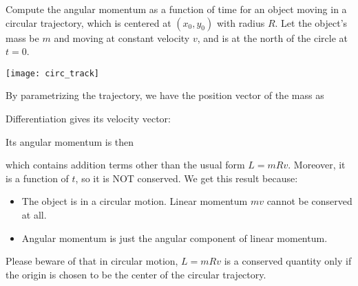 \documentclass[class=article, crop=false, 12pt]{standalone}
\begin{document}
\begin{example}
    Compute the angular momentum as a function of time for an object moving in a circular trajectory,
    which is centered at $(x_0,y_0)$ with radius $R$.
    Let the object's mass be $m$ and moving at constant velocity $v$, 
    and is at the north of the circle at $t=0$.
    
    \begin{center}
        \begin{minipage}{0.4\linewidth}
            \centering
            \texttt{[image: circ\_track]}
        \end{minipage}
    \end{center}

    By parametrizing the trajectory, we have the position vector of the mass as
    
    Differentiation gives its velocity vector:

    Its angular momentum is then

    which contains addition terms other than the usual form $L=mRv$. 
    Moreover, it is a function of $t$, so it is NOT conserved.
    We get this result because:
    \begin{itemize}
        \item The object is in a circular motion. 
        Linear momentum $mv$ cannot be conserved at all.

        \item Angular momentum is just the angular component of linear momentum.
    \end{itemize}

    Please beware of that in circular motion,
    $L=mRv$ is a conserved quantity only if the origin is chosen to be the center of the circular trajectory.
    
\end{example}
\end{document}
